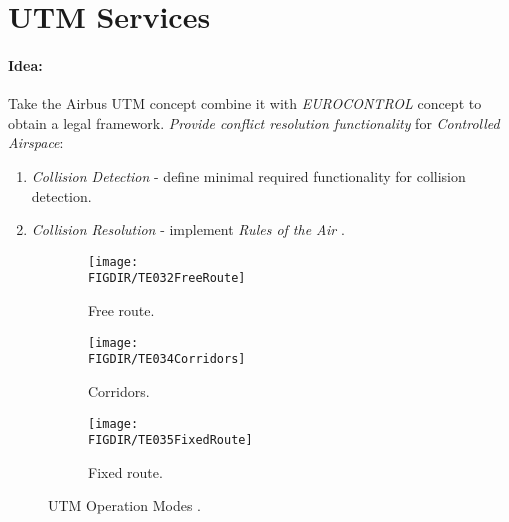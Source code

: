 \section{UTM Services}\label{s:utmServicesTheory}
\paragraph{Idea:} Take the Airbus UTM concept \cite{airbusUTM2018blueprint} combine it with \emph{EUROCONTROL} concept \cite{andrewhately2018} to obtain a legal framework. \emph{Provide conflict resolution functionality} for \emph{Controlled Airspace}:
\begin{enumerate}
    \item \emph{Collision Detection} - define minimal required functionality for collision detection.
    \item \emph{Collision Resolution} - implement \emph{Rules of the Air} \cite{standard1986recommended}.
\end{enumerate}

\begin{figure}[H]
    \centering
    \begin{subfigure}{0.32\textwidth}
        \centering
        \texttt{[image: \\FIGDIR/TE032FreeRoute]}
        \caption{Free route.}
        \label{fig:UTMFreeRouteMode}
    \end{subfigure}
    \begin{subfigure}{0.32\textwidth}
        \centering
        \texttt{[image: \\FIGDIR/TE034Corridors]} 
        \caption{Corridors.}
        \label{fig:CorridorMode}
    \end{subfigure}
    \begin{subfigure}{0.32\textwidth}
        \centering
        \texttt{[image: \\FIGDIR/TE035FixedRoute]} 
        \caption{Fixed route.}
        \label{fig:fixedRoute}
    \end{subfigure}
    
    \caption{UTM Operation Modes \cite{airbusUTM2018blueprint}.}
    \label{fig:utmOperationModes}
\end{figure}


